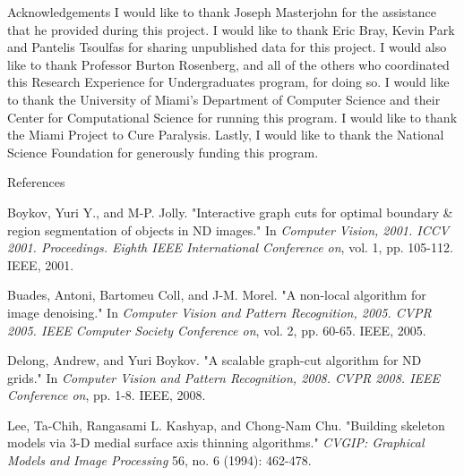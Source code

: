 \documentclass[final]{beamer}
\newlength{\colwidth}
\begin{document}
\begin{frame}[t]
\begin{columns}[t]
\begin{column}{\colwidth}
\begin{block}{Acknowledgements}
I would like to thank Joseph Masterjohn for the assistance that he provided during this project. I would like to thank Eric Bray, Kevin Park and Pantelis Tsoulfas for sharing unpublished data for this project. I would also like to thank Professor Burton Rosenberg, and all of the others who coordinated this Research Experience for Undergraduates program, for doing so. I would like to thank the University of Miami's Department of Computer Science and their Center for Computational Science for running this program. I would like to thank the Miami Project to Cure Paralysis. Lastly, I would like to thank the National Science Foundation for generously funding this program.

\end{block}


\begin{block}{References}

\nocite{*} %
\begin{thebibliography}{9}
 Boykov, Yuri Y., and M-P. Jolly. "Interactive graph cuts for optimal boundary \& region segmentation of objects in ND images." In \textit{Computer Vision, 2001. ICCV 2001. Proceedings. Eighth IEEE International Conference on}, vol. 1, pp. 105-112. IEEE, 2001.

 Buades, Antoni, Bartomeu Coll, and J-M. Morel. "A non-local algorithm for image denoising." In \textit{Computer Vision and Pattern Recognition, 2005. CVPR 2005. IEEE Computer Society Conference on}, vol. 2, pp. 60-65. IEEE, 2005.

 Delong, Andrew, and Yuri Boykov. "A scalable graph-cut algorithm for ND grids." In \textit{Computer Vision and Pattern Recognition, 2008. CVPR 2008. IEEE Conference on}, pp. 1-8. IEEE, 2008.

 Lee, Ta-Chih, Rangasami L. Kashyap, and Chong-Nam Chu. "Building skeleton models via 3-D medial surface axis thinning algorithms." \textit{CVGIP: Graphical Models and Image Processing} 56, no. 6 (1994): 462-478.

\end{thebibliography}
\end{block}


\end{column}
\end{columns}
\end{frame}
\end{document}
